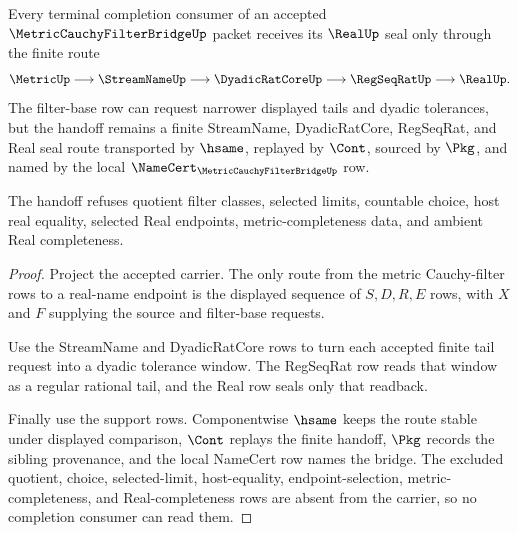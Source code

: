 \begin{theorem}
\label{thm:metric-cauchy-filter-bridge-real-completion-handoff}
Every terminal completion consumer of an accepted $\MetricCauchyFilterBridgeUp$ packet receives its $\RealUp$ seal only through the finite route
$$
\MetricUp \longrightarrow \StreamNameUp \longrightarrow \DyadicRatCoreUp \longrightarrow \RegSeqRatUp \longrightarrow \RealUp .
$$
The filter-base row can request narrower displayed tails and dyadic tolerances, but the handoff remains a finite StreamName, DyadicRatCore, RegSeqRat, and Real seal route transported by $\hsame$, replayed by $\Cont$, sourced by $\Pkg$, and named by the local $\NameCert_{\MetricCauchyFilterBridgeUp}$ row.

The handoff refuses quotient filter classes, selected limits, countable choice, host real equality, selected Real endpoints, metric-completeness data, and ambient Real completeness.
\end{theorem}
\begin{proof}
Project the accepted carrier. The only route from the metric Cauchy-filter rows to a real-name endpoint is the displayed sequence of $S,D,R,E$ rows, with $X$ and $F$ supplying the source and filter-base requests.

Use the StreamName and DyadicRatCore rows to turn each accepted finite tail request into a dyadic tolerance window. The RegSeqRat row reads that window as a regular rational tail, and the Real row seals only that readback.

Finally use the support rows. Componentwise $\hsame$ keeps the route stable under displayed comparison, $\Cont$ replays the finite handoff, $\Pkg$ records the sibling provenance, and the local NameCert row names the bridge. The excluded quotient, choice, selected-limit, host-equality, endpoint-selection, metric-completeness, and Real-completeness rows are absent from the carrier, so no completion consumer can read them.
\end{proof}



